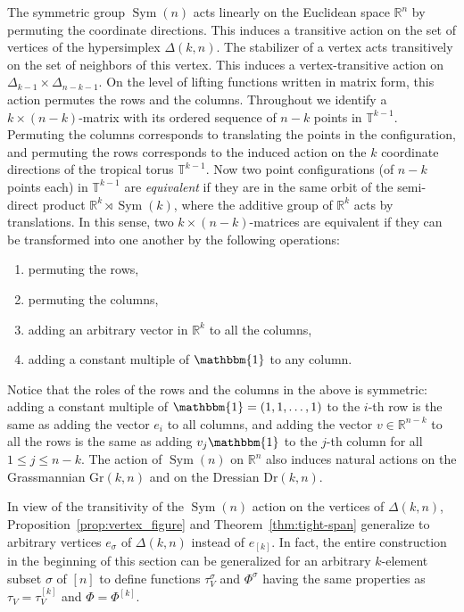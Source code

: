 \documentclass[11pt,a4paper]{amsart}
\newcommand{\RR}{{\mathbb{R}}}
\newcommand{\vones}{\mathbbm{1}}
\DeclareMathOperator{\Sym}{Sym}
\newcommand{\Hypersimplex}[2]{{\Delta(#1,#2)}}
\newcommand{\TT}{{\mathbb{T}}}
\newcommand{\Gr}[2]{{\mathrm{Gr}(#1,#2)}}
\newcommand{\Dr}[2]{{\mathrm{Dr}(#1,#2)}}
\theoremstyle{plain}
\theoremstyle{definition}
\begin{document}
The symmetric group $\Sym(n)$ acts linearly on the Euclidean space $\RR^n$ by permuting the
coordinate directions.  This induces a transitive action on the set of vertices of the hypersimplex
$\Delta(k,n)$.  The stabilizer of a vertex acts transitively on the set of neighbors of this vertex.  
This induces a vertex-transitive action on $\Delta_{k-1}\times\Delta_{n-k-1}$.  On the level
of lifting functions written in matrix form, this action permutes the rows and the columns.
Throughout we identify a $k{\times}(n-k)$-matrix with its ordered sequence of $n-k$ points in
$\TT^{k-1}$.  Permuting the columns corresponds to translating the points in the configuration, and
permuting the rows corresponds to the induced action on the $k$ coordinate directions of the
tropical torus $\TT^{k-1}$.  Now two point configurations (of $n-k$ points each) in $\TT^{k-1}$ are
\emph{equivalent} if they are in the same orbit of the semi-direct product $\RR^k\rtimes\Sym(k)$,
where the additive group of $\RR^k$ acts by translations.  In this sense, two
$k{\times}(n-k)$-matrices are equivalent if they can be transformed into one another by the
following operations:
\begin{enumerate}
\item permuting the rows,
\item permuting the columns,
\item adding an arbitrary vector in $\RR^k$ to all the columns,
\item adding a constant multiple of $\vones$ to any column.
\end{enumerate}
Notice that the roles of the rows and the columns in the above is symmetric: adding a constant
multiple of $\vones=(1,1,\dots,1)$ to the $i$-th row is the same as adding the vector $e_i$ to all
columns, and adding the vector $v\in\RR^{n-k}$ to all the rows is the same as adding $v_j\vones$ to
the $j$-th column for all $1\le j\le n-k$.  The action of $\Sym(n)$ on $\RR^n$ also induces natural
actions on the Grassmannian $\Gr kn$ and on the Dressian $\Dr kn$.

In view of the transitivity of the $\Sym(n)$ action on the vertices of $\Delta(k,n)$,
Proposition~\ref{prop:vertex_figure} and Theorem~\ref{thm:tight-span} generalize to arbitrary
vertices $e_\sigma$ of $\Hypersimplex kn$ instead of $e_{[k]}$. In fact, the entire construction in
the beginning of this section can be generalized for an arbitrary $k$-element subset $\sigma$ of
$[n]$ to define functions $\tau^\sigma_V$ and $\Phi^\sigma$ having the same properties as
$\tau_V=\tau^{[k]}_V$ and $\Phi=\Phi^{[k]}$.
\end{document}

